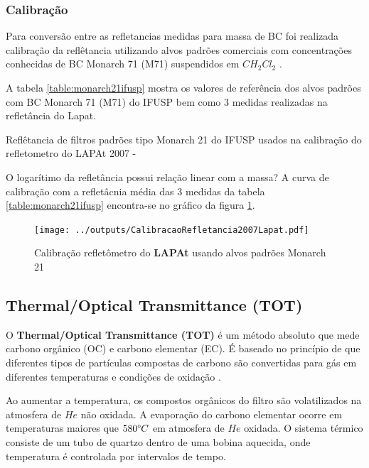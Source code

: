 \subsubsection{Calibração}

Para conversão entre as refletancias medidas para massa de BC foi realizada 
calibração da reflêtancia utilizando alvos padrões comerciais 
com concentrações conhecidas de BC Monarch 71 (M71) suspendidos em 
$CH_2Cl_2$ \citep{clarke1986}. 

A tabela \ref{table:monarch21ifusp} mostra os valores de referência dos 
alvos padrões com BC Monarch 71 (M71) do IFUSP bem como 3 medidas realizadas 
na refletância do Lapat. 

\begin{table}[H]
 \centering
    
  \caption{Reflêtancia de filtros padrões tipo Monarch 21 \citep{clarke1986} 
           do IFUSP usados na calibração do refletometro do 
           LAPAt 2007 - \label{table:monarch21ifusp}}
\end{table}

O logarítimo da refletância possui relação linear com a massa?
A curva de calibração com a refletâcnia média das 3 medidas da tabela 
\ref{table:monarch21ifusp} encontra-se no gráfico da figura 
\ref{fig:mocarch21calib}. 

\begin{figure}[H]
  \centering
  \texttt{[image: ../outputs/CalibracaoRefletancia2007Lapat.pdf]}
  \caption{Calibração refletômetro do \textbf{LAPAt} usando alvos padrões Monarch 21
          \label{fig:mocarch21calib}}
\end{figure}

\subsection{Thermal/Optical Transmittance (TOT)}

O \textbf{Thermal/Optical Transmittance (TOT)} é um método absoluto
que mede carbono orgânico (OC) e carbono elementar (EC).
É baseado no princípio  de que diferentes tipos de partículas
compostas de carbono são convertidas para gás em diferentes temperaturas e condições
de oxidação \citep{birch1998}.

Ao aumentar a temperatura, os compostos orgânicos do filtro são volatilizados 
na atmosfera de $He$ não oxidada.
A evaporação do carbono elementar ocorre em temperaturas maiores que 
$580 \degree C$ em atmosfera de $He$ oxidada.
O sistema térmico consiste de um tubo de quartzo dentro de uma bobina aquecida, 
onde temperatura é controlada por intervalos de tempo.  

